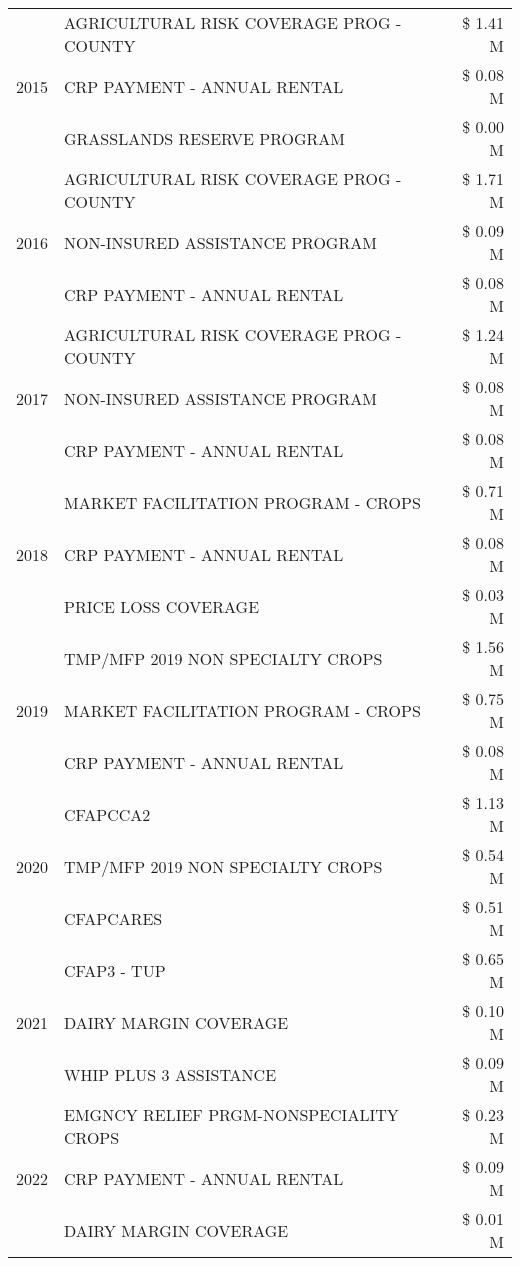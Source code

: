 \begin{tabular}{llr}
\cline{1-3}
\multirow[t]{3}{*}{2015} & AGRICULTURAL RISK COVERAGE PROG - COUNTY & \$ 1.41 M \\
 & CRP PAYMENT - ANNUAL RENTAL & \$ 0.08 M \\
 & GRASSLANDS RESERVE PROGRAM & \$ 0.00 M \\
\cline{1-3}
\multirow[t]{3}{*}{2016} & AGRICULTURAL RISK COVERAGE PROG - COUNTY & \$ 1.71 M \\
 & NON-INSURED ASSISTANCE PROGRAM & \$ 0.09 M \\
 & CRP PAYMENT - ANNUAL RENTAL & \$ 0.08 M \\
\cline{1-3}
\multirow[t]{3}{*}{2017} & AGRICULTURAL RISK COVERAGE PROG - COUNTY & \$ 1.24 M \\
 & NON-INSURED ASSISTANCE PROGRAM & \$ 0.08 M \\
 & CRP PAYMENT - ANNUAL RENTAL & \$ 0.08 M \\
\cline{1-3}
\multirow[t]{3}{*}{2018} & MARKET FACILITATION PROGRAM - CROPS & \$ 0.71 M \\
 & CRP PAYMENT - ANNUAL RENTAL & \$ 0.08 M \\
 & PRICE LOSS COVERAGE & \$ 0.03 M \\
\cline{1-3}
\multirow[t]{3}{*}{2019} & TMP/MFP 2019 NON SPECIALTY CROPS & \$ 1.56 M \\
 & MARKET FACILITATION PROGRAM - CROPS & \$ 0.75 M \\
 & CRP PAYMENT - ANNUAL RENTAL & \$ 0.08 M \\
\cline{1-3}
\multirow[t]{3}{*}{2020} & CFAPCCA2 & \$ 1.13 M \\
 & TMP/MFP 2019 NON SPECIALTY CROPS & \$ 0.54 M \\
 & CFAPCARES & \$ 0.51 M \\
\cline{1-3}
\multirow[t]{3}{*}{2021} & CFAP3 - TUP & \$ 0.65 M \\
 & DAIRY MARGIN COVERAGE & \$ 0.10 M \\
 & WHIP PLUS 3 ASSISTANCE & \$ 0.09 M \\
\cline{1-3}
\multirow[t]{3}{*}{2022} & EMGNCY RELIEF PRGM-NONSPECIALITY CROPS & \$ 0.23 M \\
 & CRP PAYMENT - ANNUAL RENTAL & \$ 0.09 M \\
 & DAIRY MARGIN COVERAGE & \$ 0.01 M \\
\cline{1-3}
\bottomrule
\end{tabular}
